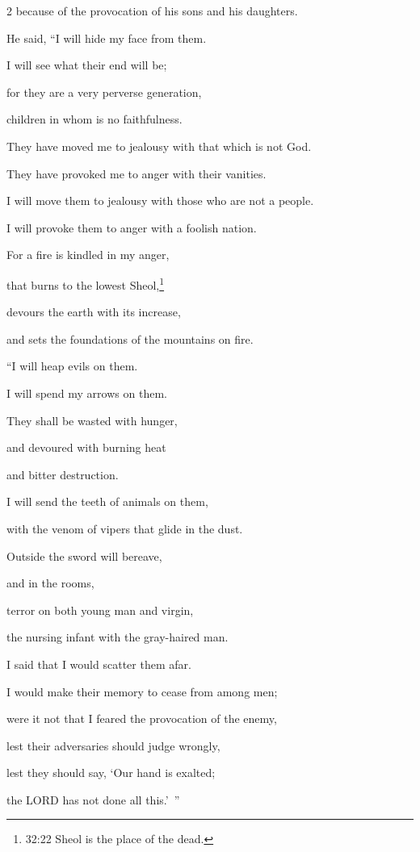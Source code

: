\begin{multicols}{2}
because of the provocation of his sons and his daughters.

\myverse{}He said, “I will hide my face from them.

I will see what their end will be;

for they are a very perverse generation,

children in whom is no faithfulness.

\myverse{}They have moved me to jealousy with that which is not God.

They have provoked me to anger with their vanities.

I will move them to jealousy with those who are not a people.

I will provoke them to anger with a foolish nation.

\myverse{}For a fire is kindled in my anger,

that burns to the lowest Sheol,\footnote{32:22 Sheol is the place of the dead.}

devours the earth with its increase,

and sets the foundations of the mountains on fire.


\vspace{\baselineskip} 
\myverse{}“I will heap evils on them.

I will spend my arrows on them.

\myverse{}They shall be wasted with hunger,

and devoured with burning heat

and bitter destruction.

I will send the teeth of animals on them,

with the venom of vipers that glide in the dust.

\myverse{}Outside the sword will bereave,

and in the rooms,

terror on both young man and virgin,

the nursing infant with the gray-haired man.

\myverse{}I said that I would scatter them afar.

I would make their memory to cease from among men;

\myverse{}were it not that I feared the provocation of the enemy,

lest their adversaries should judge wrongly,

lest they should say, ‘Our hand is exalted;

the LORD has not done all this.’ ”



\end{multicols}

